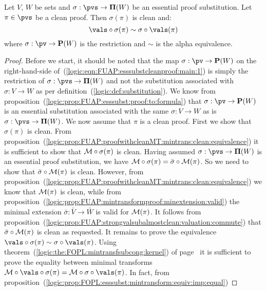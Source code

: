 \begin{prop}\label{logic:prop:FUAP:esssubstcleanproof:main}
Let $V$, $W$ be sets and $\sigma:\pvs\to{\bf\Pi}(W)$ be an essential
proof substitution. Let $\pi\in\pvs$ be a clean proof. Then
$\sigma(\pi)$ is clean and:
    \begin{equation}\label{logic:eqn:FUAP:esssubstcleanproof:main:1}
    \vals\circ\sigma(\pi)\sim\sigma\circ\vals(\pi)
    \end{equation}
where $\sigma:\pv\to{\bf P}(W)$ is the restriction and $\sim$ is the
alpha equivalence.
\end{prop}
\begin{proof}
Before we start, it should be noted that the map $\sigma:\pv\to{\bf
P}(W)$ on the right-hand-side
of~(\ref{logic:eqn:FUAP:esssubstcleanproof:main:1}) is simply the
restriction of $\sigma:\pvs\to{\bf\Pi}(W)$ and not the substitution
associated with $\sigma:V\to W$ as per
definition~(\ref{logic:def:substitution}). We know from
proposition~(\ref{logic:prop:FUAP:esssubst:proof:to:formula}) that
$\sigma:\pv\to{\bf P}(W)$ is an essential substitution associated
with the same $\sigma:V\to W$ as is $\sigma:\pvs\to{\bf\Pi}(W)$. We
now assume that $\pi$ is a clean proof. First we show that
$\sigma(\pi)$ is clean. From
proposition~(\ref{logic:prop:FUAP:proofwithcleanMT:mintrans:clean:equivalence})
it is sufficient to show that ${\cal M}\circ\sigma(\pi)$ is clean.
Having assumed $\sigma:\pvs\to{\bf\Pi}(W)$ is an essential proof
substitution, we have ${\cal
M}\circ\sigma(\pi)=\bar{\sigma}\circ{\cal M}(\pi)$. So we need to
show that $\bar{\sigma}\circ{\cal M}(\pi)$ is clean. However, from
proposition~(\ref{logic:prop:FUAP:proofwithcleanMT:mintrans:clean:equivalence})
we know that ${\cal M}(\pi)$ is clean, while from
proposition~(\ref{logic:prop:FUAP:mintransformproof:minextension:valid})
the minimal extension $\bar{\sigma}:\bar{V}\to\bar{W}$ is valid for
${\cal M}(\pi)$. It follows from
proposition~(\ref{logic:prop:FUAP:strongvalsubalmostclean:valuation:commute})
that $\bar{\sigma}\circ{\cal M}(\pi)$ is clean as requested. It
remains to prove the equivalence
$\vals\circ\sigma(\pi)\sim\sigma\circ\vals(\pi)$. Using
theorem~(\ref{logic:the:FOPL:mintransfsubcong:kernel}) of
page~\pageref{logic:the:FOPL:mintransfsubcong:kernel} it is
sufficient to prove the equality between minimal transforms ${\cal
M}\circ\vals\circ\sigma(\pi)={\cal M}\circ\sigma\circ\vals(\pi)$. In
fact, from
proposition~(\ref{logic:prop:FOPL:esssubst:mintransform:equiv:imp:equal})

\end{proof}
